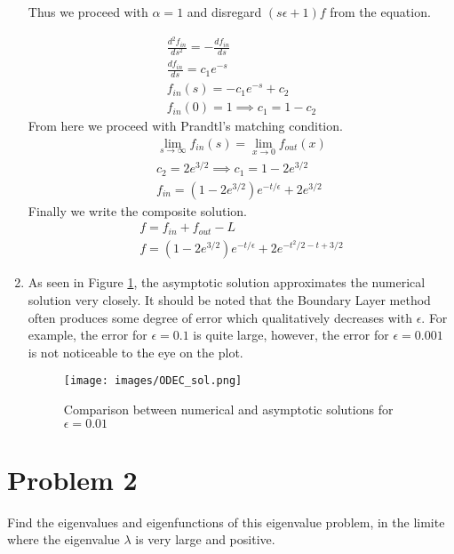 \documentclass{article}
\begin{document}
\begin{enumerate}[label=\alph*.]
    Thus we proceed with $\alpha = 1$ and disregard $(s\epsilon +1)f$ from
    the equation. 

    \begin{gather*}
        \frac{d^2f_{in}}{ds^2} = -\frac{df_{in}}{ds}\\
        \frac{df_{in}}{ds} = c_1e^{-s}\\
        f_{in}(s) = -c_1e^{-s} + c_2\\
        f_{in}(0) = 1 \implies c_1 = 1 - c_2
    \end{gather*}
    From here we proceed with Prandtl's matching condition.
    \begin{gather*}
        \lim_{s\to\infty} f_{in}(s) = \lim_{x\to0} f_{out}(x)\\
        c_2 = 2e^{3/2} \implies c_1 = 1 - 2e^{3/2}\\
        f_{in} = (1 - 2e^{3/2})e^{-t/\epsilon} + 2e^{3/2}
    \end{gather*}
    Finally we write the composite solution. 
    \begin{gather*}
        f = f_{in} + f_{out} - L\\
        f = (1 - 2e^{3/2})e^{-t/\epsilon} + 2e^{-t^2/2 - t + 3/2}
    \end{gather*}

    \item As seen in Figure \ref{fig:ODEC_comp}, the asymptotic solution approximates the
    numerical solution very closely. It should be noted that the Boundary Layer
    method often produces some degree of error which qualitatively decreases with
    $\epsilon$. For example, the error for $\epsilon = 0.1$ is quite large,
    however, the error for $\epsilon = 0.001$ is not noticeable to the eye on
    the plot. 
        \begin{figure}
            \centering
            \texttt{[image: images/ODEC\_sol.png]}
            \caption{Comparison between numerical and asymptotic solutions for
            $\epsilon = 0.01$}
            \label{fig:ODEC_comp}
        \end{figure}

\end{enumerate}

\vspace{10pt}

\hline

\vspace{10pt}

\section*{Problem 2}
Find the eigenvalues and eigenfunctions of this eigenvalue problem, in the
limite where the eigenvalue $\lambda$ is very large and positive. 
\end{document}
